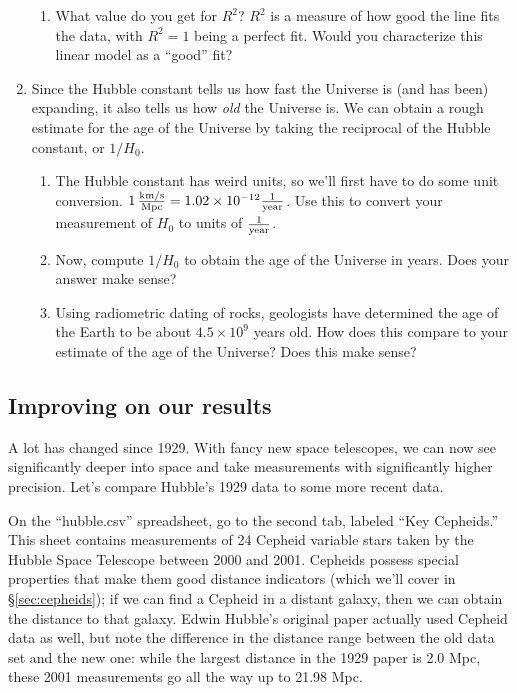 \documentclass[11pt]{article}
\begin{document}
\begin{enumerate}
\begin{enumerate}
            \item What value do you get for $R^2$? $R^2$ is a measure of how good the line fits the data, with $R^2 = 1$ being a perfect fit. Would you characterize this linear model as a ``good'' fit?
        \end{enumerate}
        
    \item Since the Hubble constant tells us how fast the Universe is (and has been) expanding, it also tells us how \emph{old} the Universe is. We can obtain a rough estimate for the age of the Universe by taking the reciprocal of the Hubble constant, or $1/H_0$.
    \begin{enumerate}
        \item The Hubble constant has weird units, so we'll first have to do some unit conversion. $1 \rm \, \frac{km/s}{Mpc} = 1.02 \times 10^{-12} \frac{1}{year}$. Use this to convert your measurement of $H_0$ to units of $\frac{1}{\rm year}$.
        
        \item Now, compute $1/H_0$ to obtain the age of the Universe in years. Does your answer make sense?
        
        \item Using radiometric dating of rocks, geologists have determined the age of the Earth to be about $4.5 \times 10^9$ years old. How does this compare to your estimate of the age of the Universe? Does this make sense?
    \end{enumerate}
\end{enumerate}

\subsection{Improving on our results}

A lot has changed since 1929. With fancy new space telescopes, we can now see significantly deeper into space and take measurements with significantly higher precision. Let's compare Hubble's 1929 data to some more recent data.

\medskip \noindent
On the ``hubble.csv'' spreadsheet, go to the second tab, labeled ``Key Cepheids.'' This sheet contains measurements of 24 Cepheid variable stars taken by the Hubble Space Telescope between 2000 and 2001. Cepheids possess special properties that make them good distance indicators (which we'll cover in \S\ref{sec:cepheids}); if we can find a Cepheid in a distant galaxy, then we can obtain the distance to that galaxy. Edwin Hubble's original paper actually used Cepheid data as well, but note the difference in the distance range between the old data set and the new one: while the largest distance in the 1929 paper is 2.0 Mpc, these 2001 measurements go all the way up to 21.98 Mpc.
\end{document}
